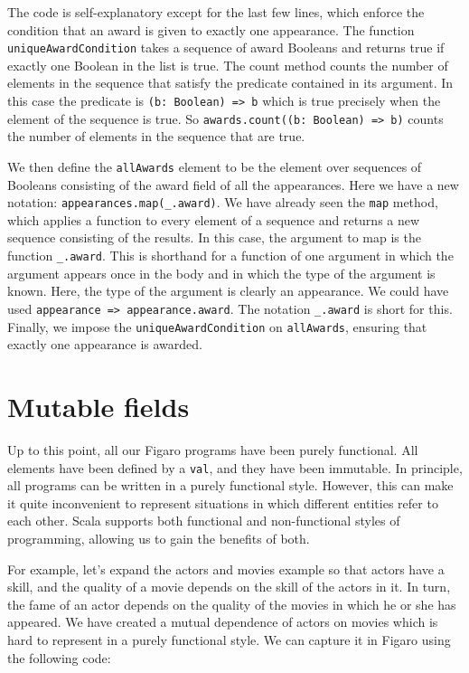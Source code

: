 The code is self-explanatory except for the last few lines, which enforce the condition that an award is given to exactly one appearance. The function \texttt{uniqueAwardCondition} takes a sequence of award Booleans and returns true if exactly one Boolean in the list is true. The count method counts the number of elements in the sequence that satisfy the predicate contained in its argument. In this case the predicate is \texttt{(b: Boolean) => b} which is true precisely when the element of the sequence is true. So \texttt{awards.count((b: Boolean) => b)} counts the number of elements in the sequence that are true.

We then define the \texttt{allAwards} element to be the element over sequences of Booleans consisting of the award field of all the appearances.  Here we have a new notation: \texttt{appearances.map(\_.award)}. We have already seen the \texttt{map} method, which applies a function to every element of a sequence and returns a new sequence consisting of the results. In this case, the argument to map is the function \texttt{\_.award}. This is shorthand for a function of one argument in which the argument appears once in the body and in which the type of the argument is known. Here, the type of the argument is clearly an appearance. We could have used \texttt{appearance => appearance.award}. The notation \texttt{\_.award} is short for this. Finally, we impose the \texttt{uniqueAwardCondition} on \texttt{allAwards}, ensuring that exactly one appearance is awarded.

\section{Mutable fields}

Up to this point, all our Figaro programs have been purely functional. All elements have been defined by a \texttt{val}, and they have been immutable. In principle, all programs can be written in a purely functional style. However, this can make it quite inconvenient to represent situations in which different entities refer to each other. Scala supports both functional and non-functional styles of programming, allowing us to gain the benefits of both.

For example, let's expand the actors and movies example so that actors have a skill, and the quality of a movie depends on the skill of the actors in it. In turn, the fame of an actor depends on the quality of the movies in which he or she has appeared. We have created a mutual dependence of actors on movies which is hard to represent in a purely functional style. We can capture it in Figaro using the following code:

